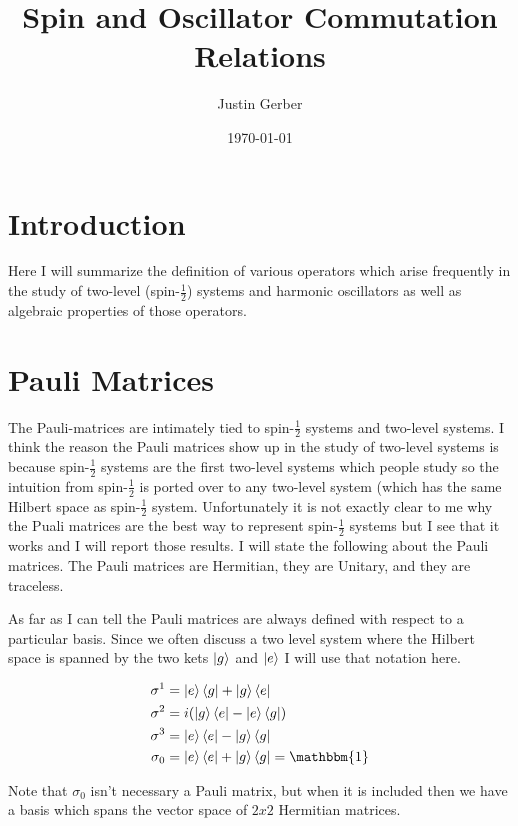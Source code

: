 \documentclass[12pt]{article}
\begin{document}
\title{Spin and Oscillator Commutation Relations}
\author{Justin Gerber}
\date{\today}
\maketitle

\section{Introduction}

Here I will summarize the definition of various operators which arise frequently in the study of two-level (spin-$\frac{1}{2}$) systems and harmonic oscillators as well as algebraic properties of those operators.

\section{Pauli Matrices}

The Pauli-matrices are intimately tied to spin-$\frac{1}{2}$ systems and two-level systems. I think the reason the Pauli matrices show up in the study of two-level systems is because spin-$\frac{1}{2}$ systems are the first two-level systems which people study so the intuition from spin-$\frac{1}{2}$ is ported over to any two-level system (which has the same Hilbert space as spin-$\frac{1}{2}$ system. Unfortunately it is not exactly clear to me why the Puali matrices are the best way to represent spin-$\frac{1}{2}$ systems but I see that it works and I will report those results. I will state the following about the Pauli matrices. The Pauli matrices are Hermitian, they are Unitary, and they are traceless.

As far as I can tell the Pauli matrices are always defined with respect to a particular basis. Since we often discuss a two level system where the Hilbert space is spanned by the two kets $\ket{g}$ and $\ket{e}$ I will use that notation here.

\begin{align}
\sigma^1 &= \ket{e}\bra{g} + \ket{g}\bra{e}\\
\sigma^2 &= i(\ket{g}\bra{e} - \ket{e}\bra{g})\\
\sigma^3 &= \ket{e}\bra{e} - \ket{g}\bra{g}\\
\sigma_0 &= \ket{e}\bra{e} + \ket{g}\bra{g} = \mathbbm{1}
\end{align}

Note that $\sigma_0$ isn't necessary a Pauli matrix, but when it is included then we have a basis which spans the vector space of $2x2$ Hermitian matrices.
\end{document}
